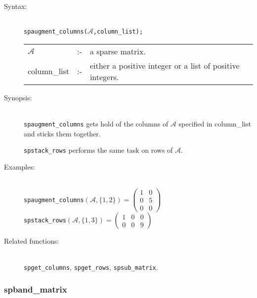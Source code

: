 \begin{description}
\item[Syntax:]\mbox{}\\
 \texttt{spaugment\_columns($\mathcal{A}$,column\_list);}\\[2mm]
\begin{tabular}{l l l}
$\mathcal{A}$  &:-& a sparse matrix. \\
column\_list &:-&  either a positive integer or a list of positive
                   integers.
\end{tabular}

\item[Synopsis:]\mbox{}\\
\texttt{spaugment\_columns} gets hold of the columns of $\mathcal{A}$ specified
in column\_list and sticks them together.

\texttt{spstack\_rows} performs the same task on rows of
                $\mathcal{A}$.

\item[Examples:]\mbox{}\\
\texttt{spaugment\_columns}\((\mathcal{A},\{1,2\})  =
\begin{pmatrix} 1 & 0 \\ 0 & 5 \\ 0 & 0 \end{pmatrix}\)  \\[2mm]
\texttt{spstack\_rows}\((\mathcal{A},\{1,3\})  =
\begin{pmatrix} 1 & 0 & 0 \\ 0 & 0 & 9 \end{pmatrix}\)

\item[Related functions:]\mbox{}\\
\texttt{spget\_columns}, \texttt{spget\_rows},
\texttt{spsub\_matrix}.
\end{description}

\subsubsection{spband\_matrix}
\label{sparse:spband_matrix}

